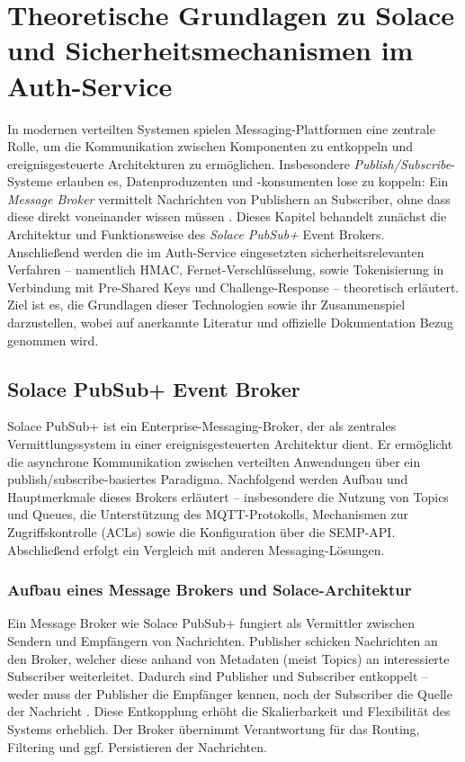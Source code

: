 \section{Theoretische Grundlagen zu Solace und Sicherheitsmechanismen im Auth-Service}

In modernen verteilten Systemen spielen Messaging-Plattformen eine zentrale Rolle, um die Kommunikation zwischen Komponenten zu entkoppeln und ereignisgesteuerte Architekturen zu ermöglichen. Insbesondere \textit{Publish/Subscribe}-Systeme erlauben es, Datenproduzenten und -konsumenten lose zu koppeln: Ein \textit{Message Broker} vermittelt Nachrichten von Publishern an Subscriber, ohne dass diese direkt voneinander wissen müssen \cite{Eugster2003}. Dieses Kapitel behandelt zunächst die Architektur und Funktionsweise des \textit{Solace PubSub+} Event Brokers. Anschließend werden die im Auth-Service eingesetzten sicherheitsrelevanten Verfahren – namentlich HMAC, Fernet-Verschlüsselung, sowie Tokenisierung in Verbindung mit Pre-Shared Keys und Challenge-Response – theoretisch erläutert. Ziel ist es, die Grundlagen dieser Technologien sowie ihr Zusammenspiel darzustellen, wobei auf anerkannte Literatur und offizielle Dokumentation Bezug genommen wird.

\subsection{Solace PubSub+ Event Broker}
Solace PubSub+ ist ein Enterprise-Messaging-Broker, der als zentrales Vermittlungssystem in einer ereignisgesteuerten Architektur dient. Er ermöglicht die asynchrone Kommunikation zwischen verteilten Anwendungen über ein publish/subscribe-basiertes Paradigma. Nachfolgend werden Aufbau und Hauptmerkmale dieses Brokers erläutert – insbesondere die Nutzung von Topics und Queues, die Unterstützung des MQTT-Protokolls, Mechanismen zur Zugriffskontrolle (ACLs) sowie die Konfiguration über die SEMP-API. Abschließend erfolgt ein Vergleich mit anderen Messaging-Lösungen.

\subsubsection{Aufbau eines Message Brokers und Solace-Architektur}

Ein Message Broker wie Solace PubSub+ fungiert als Vermittler zwischen Sendern und Empfängern von Nachrichten. Publisher schicken Nachrichten an den Broker, welcher diese anhand von Metadaten (meist Topics) an interessierte Subscriber weiterleitet. Dadurch sind Publisher und Subscriber entkoppelt – weder muss der Publisher die Empfänger kennen, noch der Subscriber die Quelle der Nachricht \cite{Eugster2003}. Diese Entkopplung erhöht die Skalierbarkeit und Flexibilität des Systems erheblich. Der Broker übernimmt Verantwortung für das Routing, Filtering und ggf. Persistieren der Nachrichten.

